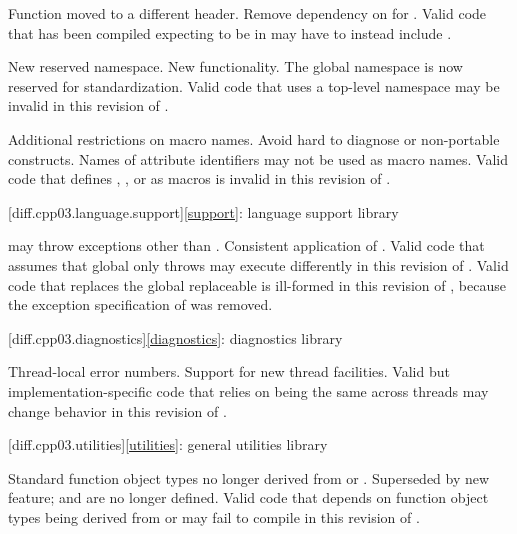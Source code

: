 \change
Function  moved to a different header.
\rationale
Remove dependency on  for .
\effect
Valid \CppIII{} code that has been compiled expecting  to be in
 may have to instead include .

\change
New reserved namespace.
\rationale
New functionality.
\effect
The global namespace  is now reserved for standardization. Valid
\CppIII{} code that uses a top-level namespace  may be invalid in
this revision of \Cpp{}.

\change
Additional restrictions on macro names.
\rationale
Avoid hard to diagnose or non-portable constructs.
\effect
Names of attribute identifiers may not be used as macro names. Valid \CppIII{}
code that defines , , or
 as macros is invalid in this
revision of \Cpp{}.

[diff.cpp03.language.support]{\ref*{support}:
language support library}

\change
{} may throw exceptions other than
.
\rationale
Consistent application of .
\effect
Valid \CppIII{} code that assumes that global  only
throws  may execute differently in this revision of \Cpp{}.
Valid \CppIII{} code that replaces the global replaceable 
is ill-formed in this revision of \Cpp{},
because the exception specification of 
was removed.

[diff.cpp03.diagnostics]{\ref*{diagnostics}: diagnostics library}

\change
Thread-local error numbers.
\rationale
Support for new thread facilities.
\effect
Valid but implementation-specific \CppIII{} code that relies on
 being the same across threads may change behavior in this
revision of \Cpp{}.

[diff.cpp03.utilities]{\ref*{utilities}: general utilities library}

\change
Standard function object types no longer derived from
 or .
\rationale
Superseded by new feature;  and
 are no longer defined.
\effect
Valid \CppIII{} code that depends on function object types being derived from
 or  may fail to compile
in this revision of \Cpp{}.


